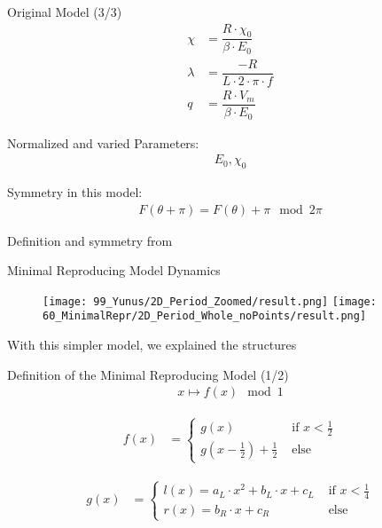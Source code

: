 \begin{frame}{Original Model (3/3)}
    \vspace{-3.0em}
    \begin{align}
        \chi    & = \dfrac{R \cdot \chi_0}{\beta \cdot E_0} \\
        \lambda & = \dfrac{-R}{L \cdot 2 \cdot \pi \cdot f} \\
        q       & = \dfrac{R \cdot V_m}{\beta \cdot E_0}
    \end{align}

    Normalized and varied Parameters:
    \begin{align*}
        E_0, \chi_0
    \end{align*}

    Symmetry in this model:
    \begin{align}
        F(\theta + \pi) = F(\theta) + \pi \mod 2 \pi
    \end{align}

    \begin{flushright}
        Definition and symmetry from \cite{akyuz2022}
    \end{flushright}
\end{frame}

\begin{frame}{Minimal Reproducing Model Dynamics}
    \begin{figure}
        \texttt{[image: 99\_Yunus/2D\_Period\_Zoomed/result.png]}
        \qquad
        \texttt{[image: 60\_MinimalRepr/2D\_Period\_Whole\_noPoints/result.png]}
    \end{figure}
    With this simpler model, we explained the structures
\end{frame}

\begin{frame}{Definition of the Minimal Reproducing Model (1/2)}
    \vspace{-3.0em}
    \begin{align}
        x \mapsto f(x) \mod 1
    \end{align}

    \begin{align}
        f(x) & = \begin{cases}
                     g(x)                                        & \text{ if } x < \frac{1}{2} \\
                     g\left(x - \frac{1}{2}\right) + \frac{1}{2} & \text{ else}
                 \end{cases}
    \end{align}

    \begin{align}
        g(x) & = \begin{cases}
                     l(x) = a_L \cdot x^2 + b_L \cdot x + c_L & \text{ if } x < \frac{1}{4} \\
                     r(x) = b_R \cdot x + c_R                 & \text{ else}
                 \end{cases}
    \end{align}
\end{frame}


